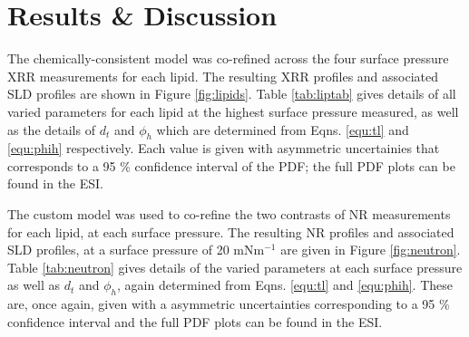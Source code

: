 \documentclass[twoside,twocolumn,9pt]{article}
\begin{document}
\section{Results \& Discussion}
The chemically-consistent model was co-refined across the four surface pressure XRR measurements for each lipid. The resulting XRR profiles and associated SLD profiles are shown in Figure \ref{fig:lipids}. Table \ref{tab:liptab} gives details of all varied parameters for each lipid at the highest surface pressure measured, as well as the details of $d_t$ and $\phi_h$ which are determined from Eqns. \ref{equ:tl} and \ref{equ:phih} respectively. Each value is given with asymmetric uncertainies that corresponds to a 95 \% confidence interval of the PDF; the full PDF plots can be found in the ESI.

The custom model was used to co-refine the two contrasts of NR measurements for each lipid, at each surface pressure. The resulting NR profiles and associated SLD profiles, at a surface pressure of 20 mNm$^{-1}$ are given in Figure \ref{fig:neutron}. Table \ref{tab:neutron} gives details of the varied parameters at each surface pressure as well as $d_t$ and $\phi_h$, again determined from Eqns. \ref{equ:tl} and \ref{equ:phih}. These are, once again, given with a asymmetric uncertainties corresponding to a 95 \% confidence interval and the full PDF plots can be found in the ESI.
%
\end{document}
